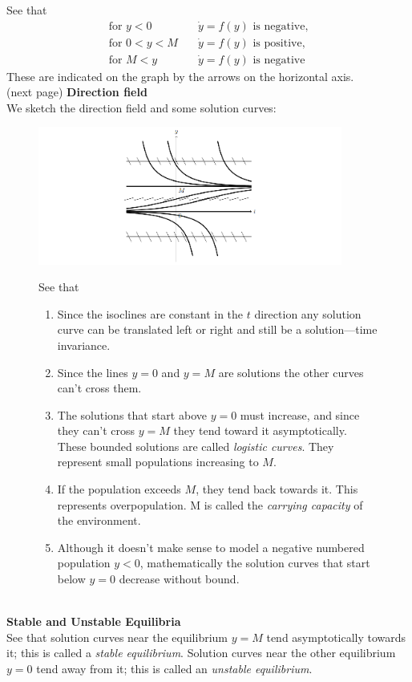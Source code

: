 \documentclass{report}
\begin{document}
See that 
\begin{align*}
\text{for }y<0\quad&\dot{y}=f(y)\text{ is negative,}\\
\text{for }0<y<M\quad&\dot{y}=f(y)\text{ is positive,}\\
\text{for }M<y\quad&\dot{y}=f(y)\text{ is negative}
\end{align*}
These are indicated on the graph by the arrows on the horizontal axis.\\
(next page)
\newpage
\noindent\textbf{Direction field}\\
We sketch the direction field and some solution curves:
\begin{figure}[h]
\begin{center}
\includegraphics[width=10cm]{16}\\
\end{center}
See that
\begin{enumerate}
\item Since the isoclines are constant in the $t$ direction any solution curve can be translated left or right and 
still be a solution---time invariance.
\item Since the lines $y=0$ and $y=M$ are solutions the other curves can't cross them.
\item The solutions that start above $y=0$ must increase, and since they can't cross $y=M$ they 
tend toward it asymptotically. These bounded solutions
are called \textit{logistic curves}. They represent small populations increasing to $M$.
\item If the population exceeds $M$, they tend back towards it. This represents overpopulation. M is called the 
\textit{carrying capacity} of the environment.
\item Although it doesn't make sense to model a negative numbered population $y<0$, mathematically the solution
curves that start below $y=0$ decrease without bound.
\end{enumerate}
\end{figure}\\
\textbf{Stable and Unstable Equilibria}\\
See that solution curves near the equilibrium $y=M$ tend asymptotically towards it; this is called a 
\textit{stable equilibrium}. Solution curves near the other equilibrium $y=0$ tend away from it; this is called
an \textit{unstable equilibrium}.
\newpage
\end{document}
